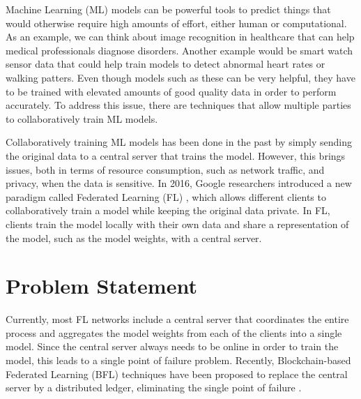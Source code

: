 
Machine Learning (ML) models can be powerful tools to predict things that would otherwise require high amounts of effort, either human or computational. As an example, we can think about image recognition in healthcare that can help medical professionals diagnose disorders. Another example would be smart watch sensor data that could help train models to detect abnormal heart rates or walking patters. Even though models such as these can be very helpful, they have to be trained with elevated amounts of good quality data in order to perform accurately. To address this issue, there are techniques that allow multiple parties to collaboratively train ML models.

Collaboratively training ML models has been done in the past by simply sending the original data to a central server that trains the model. However, this brings issues, both in terms of resource consumption, such as network traffic, and privacy, when the data is sensitive. In 2016, Google researchers introduced a new paradigm called Federated Learning (FL) \cite{10.48550/arxiv.1602.05629}, which allows different clients to collaboratively train a model while keeping the original data private. In FL, clients train the model locally with their own data and share a representation of the model, such as the model weights, with a central server. 

\section{Problem Statement}


Currently, most FL networks include a central server that coordinates the entire process and aggregates the model weights from each of the clients into a single model. Since the central server always needs to be online in order to train the model, this leads to a single point of failure problem. Recently, Blockchain-based Federated Learning (BFL) techniques have been proposed to replace the central server by a distributed ledger, eliminating the single point of failure \cite{10.48550/arxiv.2009.09338, 9403374}.


